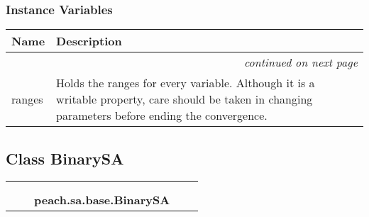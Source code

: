 
  \subsubsection{Instance Variables}

    \vspace{-1cm}
\hspace{\varindent}\begin{longtable}{|p{\varnamewidth}|p{\vardescrwidth}|l}
\cline{1-2}
\cline{1-2} \centering \textbf{Name} & \centering \textbf{Description}& \\
\cline{1-2}
\endhead\cline{1-2}\multicolumn{3}{r}{\small\textit{continued on next page}}\\\endfoot\cline{1-2}
\endlastfoot\raggedright r\-a\-n\-g\-e\-s\- & Holds the ranges for every variable. Although it is a writable
property, care should be taken in changing parameters before ending the
convergence.&\\
\cline{1-2}
\end{longtable}



\subsection{Class BinarySA}

    \label{peach:sa:base:BinarySA}
\begin{tabular}{cccccc}
\multicolumn{2}{r}{\settowidth{\BCL}{object}\multirow{2}{\BCL}{object}}
&&
  \\\cline{3-3}
  &&\multicolumn{1}{c|}{}
&&
  \\
&&\multicolumn{2}{l}{\textbf{peach.sa.base.BinarySA}}
\end{tabular}


